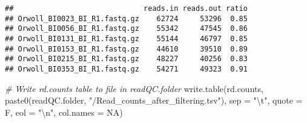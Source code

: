 \documentclass[
]{article}
\newenvironment{Shaded}{\begin{snugshade}}{\end{snugshade}}
\newcommand{\AttributeTok}[1]{\textcolor[rgb]{0.77,0.63,0.00}{#1}}
\newcommand{\CommentTok}[1]{\textcolor[rgb]{0.56,0.35,0.01}{\textit{#1}}}
\newcommand{\ConstantTok}[1]{\textcolor[rgb]{0.00,0.00,0.00}{#1}}
\newcommand{\DecValTok}[1]{\textcolor[rgb]{0.00,0.00,0.81}{#1}}
\newcommand{\FunctionTok}[1]{\textcolor[rgb]{0.00,0.00,0.00}{#1}}
\newcommand{\NormalTok}[1]{#1}
\newcommand{\OtherTok}[1]{\textcolor[rgb]{0.56,0.35,0.01}{#1}}
\newcommand{\SpecialCharTok}[1]{\textcolor[rgb]{0.00,0.00,0.00}{#1}}
\newcommand{\StringTok}[1]{\textcolor[rgb]{0.31,0.60,0.02}{#1}}
\begin{document}
\begin{Shaded}
\end{Shaded}

\begin{verbatim}
##                              reads.in reads.out ratio
## Orwoll_BI0023_BI_R1.fastq.gz    62724     53296  0.85
## Orwoll_BI0056_BI_R1.fastq.gz    55342     47545  0.86
## Orwoll_BI0131_BI_R1.fastq.gz    55144     46797  0.85
## Orwoll_BI0153_BI_R1.fastq.gz    44610     39510  0.89
## Orwoll_BI0215_BI_R1.fastq.gz    48227     40256  0.83
## Orwoll_BI0353_BI_R1.fastq.gz    54271     49323  0.91
\end{verbatim}

\begin{Shaded}
\begin{Highlighting}[]
\CommentTok{\# Write rd.counts table to file in readQC.folder}
\FunctionTok{write.table}\NormalTok{(rd.counts, }\FunctionTok{paste0}\NormalTok{(readQC.folder, }\StringTok{"/Read\_counts\_after\_filtering.tsv"}\NormalTok{), }
    \AttributeTok{sep =} \StringTok{"}\SpecialCharTok{\textbackslash{}t}\StringTok{"}\NormalTok{, }\AttributeTok{quote =}\NormalTok{ F, }\AttributeTok{eol =} \StringTok{"}\SpecialCharTok{\textbackslash{}n}\StringTok{"}\NormalTok{, }\AttributeTok{col.names =} \ConstantTok{NA}\NormalTok{)}
\end{Highlighting}
\end{Shaded}
\end{document}

